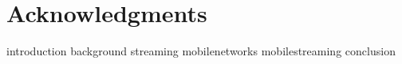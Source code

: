 \documentclass[openright,titlepage,numbers=noenddot,headinclude,footinclude=true,cleardoublepage=empty,BCOR=5mm,paper=A4,fontsize=11pt,twoside]{scrreprt}
\begin{document}




\newpage
{}
\tableofcontents



\newpage
\glsaddall
\printglossaries

\newpage
{}
\listoffigures

\newpage
{}
\listoftables

\cleardoublepage


\cleardoublepage


\newtheorem{mydef}{Definition}
\cleardoublepage
\chapter*{Acknowledgments}

\cleardoublepage
{}


{introduction}
{background}
{streaming}
{mobilenetworks}
{mobilestreaming}
{conclusion}






\begingroup
\RaggedRight
\printbibliography
\endgroup

\end{document}
